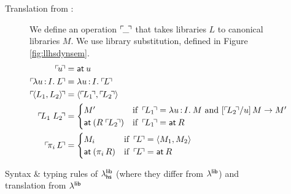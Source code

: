 \documentclass[11pt]{article}
\begin{document}
\begin{figure}
\begin{description}
    \item[Translation from \llib{}:] We define an operation $\ulcorner\!{\_}\!\urcorner$ that
      takes libraries $L$ to canonical libraries $M$. We use library
      substitution, defined in Figure \ref{fig:llhsdynsem}.
      \begin{align*}
        \trans{u} &= \at{u}\\
        \trans{\lam{u}{I}{L}} &= \lam{u}{I}{\trans{L}}\\
        \trans{\<L_1, L_2\>} &= \<\trans{L_1}, \trans{L_2}\>\\
        \trans{L_1 \ap L_2} &=
        \begin{cases}
          M' & \text{if }\,\trans{L_1} = \lam{u}{I}{M}
          \text{ and } \sub{\trans{L_2}}{u}{M} \to M'\\
          \at{(R \ap \trans{L_2})} & \text{if }\,\trans{L_1} = \at{R}\\
        \end{cases}\\
        \trans{\proj{i}{L}} &=
        \begin{cases}
          M_i & \text{if }\,\trans{L} = \<M_1, M_2\>\\
          \at{(\proj{i}{R})} & \text{if }\,\trans{L} = \at{R}
        \end{cases}
      \end{align*}

  \end{description}

  \caption{Syntax \& typing rules of $\lambda^{\textsf{lib}}_{\textsf{hs}}$ (where they differ from $\lambda^{\textsf{lib}}$)
    and translation from $\lambda^{\textsf{lib}}$}
  \label{fig:llhs}
\end{figure}
\end{document}
